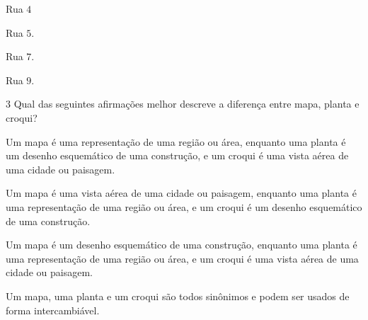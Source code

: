 \begin{escolha}
\item Rua $4$
\item Rua $5$.
\item Rua $7$.
\item Rua $9$.
\end{escolha}



\num{3}  Qual das seguintes afirmações melhor descreve a diferença entre mapa,
planta e croqui?

\begin{escolha}
\item
  Um mapa é uma representação de uma região ou área, enquanto uma planta
  é um desenho esquemático de uma construção, e um croqui é uma vista
  aérea de uma cidade ou paisagem.
\item
  Um mapa é uma vista aérea de uma cidade ou paisagem, enquanto uma
  planta é uma representação de uma região ou área, e um croqui é um
  desenho esquemático de uma construção.
\item
  Um mapa é um desenho esquemático de uma construção, enquanto uma
  planta é uma representação de uma região ou área, e um croqui é uma
  vista aérea de uma cidade ou paisagem.
\item
  Um mapa, uma planta e um croqui são todos sinônimos e podem ser usados
  de forma intercambiável.
\end{escolha}



